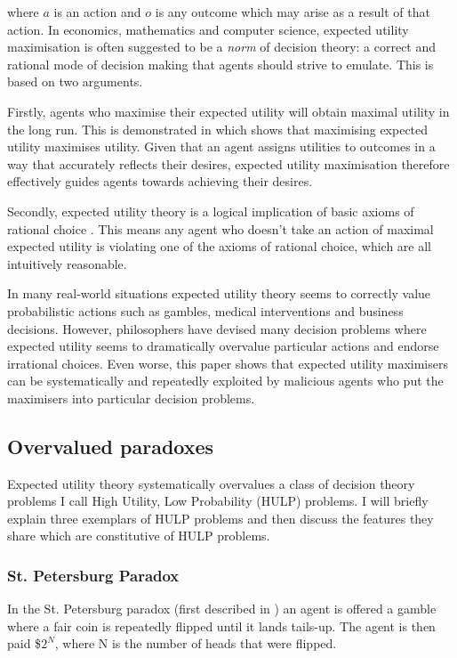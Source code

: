 \documentclass{article}
\begin{document}
where \(a\) is an action and \(o\) is any outcome which may arise as a result of that action. In economics, mathematics and computer science, expected utility maximisation is often suggested to be a \textit{norm} of decision theory: a correct and rational mode of decision making that agents should strive to emulate. This is based on two arguments.

Firstly, agents who maximise their expected utility will obtain maximal utility in the long run. This is demonstrated in \citep{von1944games} which shows that maximising expected utility maximises utility. Given that an agent assigns utilities to outcomes in a way that accurately reflects their desires, expected utility maximisation therefore effectively guides agents towards achieving their desires. 

Secondly, expected utility theory is a logical implication of basic axioms of rational choice \citep{von1944games}. This means any agent who doesn't take an action of maximal expected utility is violating one of the axioms of rational choice, which are all intuitively reasonable.

In many real-world situations expected utility theory seems to correctly value probabilistic actions such as gambles, medical interventions and business decisions. However, philosophers have devised many decision problems where expected utility seems to dramatically overvalue particular actions and endorse irrational choices. Even worse, this paper shows that expected utility maximisers can be systematically and repeatedly exploited by malicious agents who put the maximisers into particular decision problems. 

\subsection {Overvalued paradoxes}

Expected utility theory systematically overvalues a class of decision theory problems I call High Utility, Low Probability (HULP) problems. I will briefly explain three exemplars of HULP problems and then discuss the features they share which are constitutive of HULP problems.

\subsubsection {St. Petersburg Paradox}

In the St. Petersburg paradox (first described in \citep{bernoulli1954exposition}) an agent is offered a gamble where a fair coin is repeatedly flipped until it lands tails-up. The agent is then paid \$\(2^N\), where N is the number of heads that were flipped. 
\end{document}
